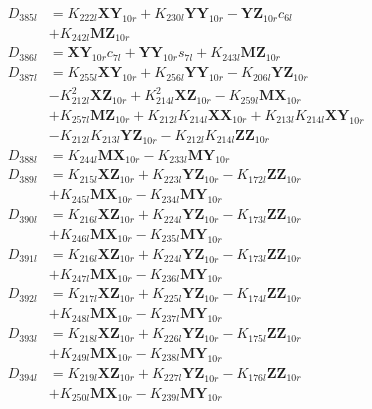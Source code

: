 \begin{multicols}{2}
\begin{align}
D_{385l} &= K_{222l}\mathbf{XY}_{10r} + K_{230l}\mathbf{YY}_{10r} - \mathbf{YZ}_{10r}c_{6l}  \nonumber \\
&+ K_{242l}\mathbf{MZ}_{10r} \nonumber \\
D_{386l} &= \mathbf{XY}_{10r}c_{7l} + \mathbf{YY}_{10r}s_{7l} + K_{243l}\mathbf{MZ}_{10r} \nonumber \\
D_{387l} &= K_{255l}\mathbf{XY}_{10r} + K_{256l}\mathbf{YY}_{10r} - K_{206l}\mathbf{YZ}_{10r}  \nonumber \\
&- K_{212l}^2\mathbf{XZ}_{10r} + K_{214l}^2\mathbf{XZ}_{10r} - K_{259l}\mathbf{MX}_{10r}  \nonumber \\
&+ K_{257l}\mathbf{MZ}_{10r} + K_{212l}K_{214l}\mathbf{XX}_{10r} + K_{213l}K_{214l}\mathbf{XY}_{10r}  \nonumber \\
&- K_{212l}K_{213l}\mathbf{YZ}_{10r} - K_{212l}K_{214l}\mathbf{ZZ}_{10r} \nonumber \\
D_{388l} &= K_{244l}\mathbf{MX}_{10r} - K_{233l}\mathbf{MY}_{10r} \nonumber \\
D_{389l} &= K_{215l}\mathbf{XZ}_{10r} + K_{223l}\mathbf{YZ}_{10r} - K_{172l}\mathbf{ZZ}_{10r}  \nonumber \\
&+ K_{245l}\mathbf{MX}_{10r} - K_{234l}\mathbf{MY}_{10r} \nonumber \\
D_{390l} &= K_{216l}\mathbf{XZ}_{10r} + K_{224l}\mathbf{YZ}_{10r} - K_{173l}\mathbf{ZZ}_{10r}  \nonumber \\
&+ K_{246l}\mathbf{MX}_{10r} - K_{235l}\mathbf{MY}_{10r} \nonumber \\
D_{391l} &= K_{216l}\mathbf{XZ}_{10r} + K_{224l}\mathbf{YZ}_{10r} - K_{173l}\mathbf{ZZ}_{10r}  \nonumber \\
&+ K_{247l}\mathbf{MX}_{10r} - K_{236l}\mathbf{MY}_{10r} \nonumber \\
D_{392l} &= K_{217l}\mathbf{XZ}_{10r} + K_{225l}\mathbf{YZ}_{10r} - K_{174l}\mathbf{ZZ}_{10r}  \nonumber \\
&+ K_{248l}\mathbf{MX}_{10r} - K_{237l}\mathbf{MY}_{10r} \nonumber \\
D_{393l} &= K_{218l}\mathbf{XZ}_{10r} + K_{226l}\mathbf{YZ}_{10r} - K_{175l}\mathbf{ZZ}_{10r}  \nonumber \\
&+ K_{249l}\mathbf{MX}_{10r} - K_{238l}\mathbf{MY}_{10r} \nonumber \\
D_{394l} &= K_{219l}\mathbf{XZ}_{10r} + K_{227l}\mathbf{YZ}_{10r} - K_{176l}\mathbf{ZZ}_{10r}  \nonumber \\
&+ K_{250l}\mathbf{MX}_{10r} - K_{239l}\mathbf{MY}_{10r} \nonumber \\

\end{align}
\end{multicols}
